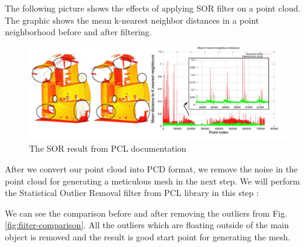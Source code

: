 \documentclass[runningheads,a4paper]{llncs}
\begin{document}
The following picture shows the effects of applying SOR filter on a point cloud. The graphic shows the mean k-nearest neighbor distances in a point neighborhood before and after filtering. \cite{12}

\begin{figure}
\centering
\includegraphics[scale=.7]{SOR.PNG}
\caption{The SOR result from PCL documentation}
\label{fig:SOR}
\end{figure}

After we convert our point cloud into PCD format, we remove the noise in the point cloud for generating a meticulous mesh in the next step. We will perform the Statistical Outlier Removal filter from PCL library in this step \cite{13}:

We can see the comparison before and after removing the outliers from Fig.  \ref{fig:fiiter-comparison}. All the outliers which are floating outside of the main object is removed and the result is good start point for generating the mesh.
\end{document}
